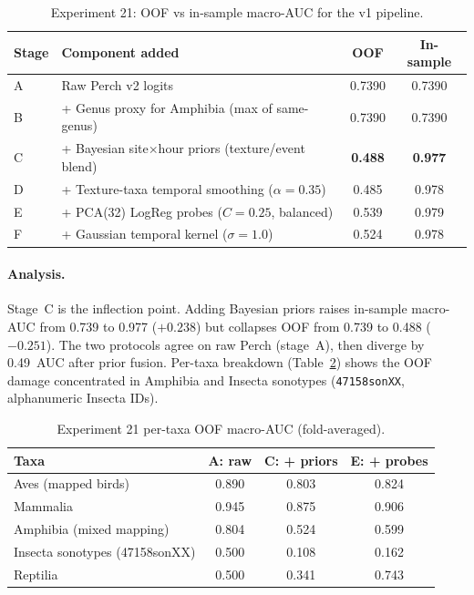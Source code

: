 \begin{table}[h]
\centering
\caption{Experiment 21: OOF vs in-sample macro-AUC for the v1 pipeline.}
\label{tab:exp21}
\begin{tabular}{llcc}
\hline
\textbf{Stage} & \textbf{Component added} & \textbf{OOF} & \textbf{In-sample} \\
\hline
A & Raw Perch v2 logits                              & 0.7390 & 0.7390 \\
B & + Genus proxy for Amphibia (max of same-genus)   & 0.7390 & 0.7390 \\
C & + Bayesian site$\times$hour priors (texture/event blend) & \textbf{0.488} & \textbf{0.977} \\
D & + Texture-taxa temporal smoothing ($\alpha{=}0.35$) & 0.485 & 0.978 \\
E & + PCA(32) LogReg probes ($C{=}0.25$, balanced)   & 0.539 & 0.979 \\
F & + Gaussian temporal kernel ($\sigma{=}1.0$)      & 0.524 & 0.978 \\
\hline
\end{tabular}
\end{table}

\paragraph{Analysis.}
Stage~C is the inflection point. Adding Bayesian priors raises in-sample
macro-AUC from 0.739 to 0.977 ($+0.238$) but collapses OOF from 0.739 to
0.488 ($-0.251$). The two protocols agree on raw Perch (stage~A), then
diverge by 0.49~AUC after prior fusion. Per-taxa breakdown (Table~\ref{tab:exp21-taxa})
shows the OOF damage concentrated in Amphibia and Insecta sonotypes
(\texttt{47158sonXX}, alphanumeric Insecta IDs).

\begin{table}[h]
\centering
\caption{Experiment 21 per-taxa OOF macro-AUC (fold-averaged).}
\label{tab:exp21-taxa}
\begin{tabular}{lccc}
\hline
\textbf{Taxa} & \textbf{A: raw} & \textbf{C: + priors} & \textbf{E: + probes} \\
\hline
Aves (mapped birds)            & 0.890 & 0.803 & 0.824 \\
Mammalia                       & 0.945 & 0.875 & 0.906 \\
Amphibia (mixed mapping)       & 0.804 & 0.524 & 0.599 \\
Insecta sonotypes (47158sonXX) & 0.500 & 0.108 & 0.162 \\
Reptilia                       & 0.500 & 0.341 & 0.743 \\
\hline
\end{tabular}
\end{table}

